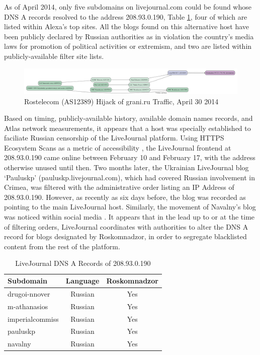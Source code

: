 As of April 2014, only five subdomains on livejournal.com could be found whose
DNS A records resolved to the address 208.93.0.190, Table
\ref{table:lj-blocked-blogs}, four of which are listed within Alexa's top sites. All
the blogs found on this alternative host have been publicly declared by Russian
authorities as in violation the country's media laws for promotion of political
activities or extremism, and two are listed within publicly-available filter
site lists. 

\begin{figure}
  \includegraphics[width=\textwidth]{resources/atlas_cache-results-measurement_id-1663748.png}
  \caption{Rostelecom (AS12389) Hijack of grani.ru Traffic, April 30 2014}
  \label{image:ru-grani-hijack}
\end{figure}

Based on timing, publicly-available history, available domain names records,
and Atlas network measurements, it appears that a host was specially
established to faciliate Russian censorship of the LiveJournal platform. 
Using HTTPS Ecosystem Scans as a metric of accessibility
\cite{projectsonar}, the LiveJournal frontend at 208.93.0.190 came online
between February 10 and February 17, with the address otherwise unused until
then. Two months later, the Ukrainian LiveJournal blog `Pauluskp'
(pauluskp.livejournal.com), which had covered Russian involvement in Crimea,
was filtered with the administrative order listing an IP Address of
208.93.0.190. However, as recently as six days before, the blog was recorded as
pointing to the main LiveJournal host. Similarly, the movement of Navalny's
blog was noticed within social media \cite{miptru2014}. It appears that in the
lead up to or at the time of filtering orders, LiveJournal coordinates with
authorities to alter the DNS A record for blogs designated by Roskomnadzor, in
order to segregate blacklisted content from the rest of the platform.

\begin{table}
    \begin{tabular}{l | c | c}
        \textbf{Subdomain} & \textbf{Language} & \textbf{Roskomnadzor}\\
        \hline
        drugoi-nnover & Russian & Yes\\
        m-athanasios & Russian & Yes\\
        imperialcommiss & Russian & Yes\\
        pauluskp & Russian & Yes \\
        navalny & Russian & Yes \\
        \hline
    \end{tabular}
    \caption{LiveJournal DNS A Records of 208.93.0.190}
    \label{table:lj-blocked-blogs}
\end{table}

